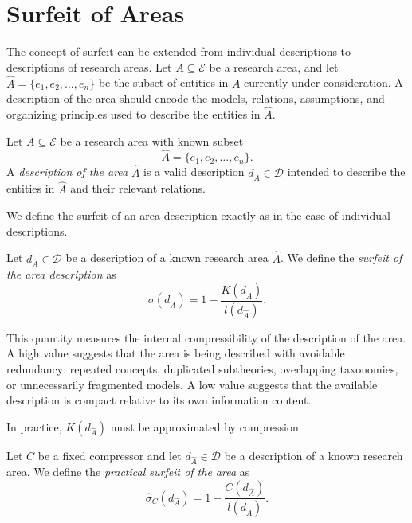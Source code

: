%
%

\section{Surfeit of Areas}
\label{sec:surfeit_areas}

The concept of surfeit can be extended from individual descriptions to descriptions of research areas. Let \(A\subseteq\mathcal E\) be a research area, and let \(\hat A=\{e_1,e_2,\ldots,e_n\}\) be the subset of entities in \(A\) currently under consideration. A description of the area should encode the models, relations, assumptions, and organizing principles used to describe the entities in \(\hat A\).

\begin{definition}
Let \(A\subseteq\mathcal E\) be a research area with known subset
\[
\hat A=\{e_1,e_2,\ldots,e_n\}.
\]
A \emph{description of the area} \(\hat A\) is a valid description \(d_{\hat A}\in\mathcal D\) intended to describe the entities in \(\hat A\) and their relevant relations.
\end{definition}

We define the surfeit of an area description exactly as in the case of individual descriptions.

\begin{definition}
Let \(d_{\hat A}\in\mathcal D\) be a description of a known research area \(\hat A\). We define the \emph{surfeit of the area description} as
\[
\sigma(d_{\hat A})
=
1-\frac{K(d_{\hat A})}{l(d_{\hat A})}.
\]
\end{definition}

This quantity measures the internal compressibility of the description of the area. A high value suggests that the area is being described with avoidable redundancy: repeated concepts, duplicated subtheories, overlapping taxonomies, or unnecessarily fragmented models. A low value suggests that the available description is compact relative to its own information content.

In practice, \(K(d_{\hat A})\) must be approximated by compression.

\begin{definition}
Let \(C\) be a fixed compressor and let \(d_{\hat A}\in\mathcal D\) be a description of a known research area. We define the \emph{practical surfeit of the area} as
\[
\hat\sigma_C(d_{\hat A})
=
1-\frac{C(d_{\hat A})}{l(d_{\hat A})}.
\]
\end{definition}

